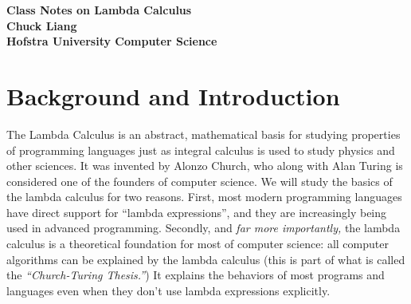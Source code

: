 \parindent=0.0cm
\parskip=0.4cm
\setlength{\textwidth}{15cm}
\setlength{\oddsidemargin}{+0.4cm}
\setlength{\evensidemargin}{0.4cm}
\setlength{\topmargin}{+0.0cm}
\setlength{\headheight}{0cm}
\setlength{\textheight}{22cm}
\setlength{\headsep}{1cm}
\renewcommand{\baselinestretch}{1.0}
\def\nvec#1,#2{#1_{1}, \ldots, #1_{#2}}

\pagestyle{plain}



\newcommand\rrr  {\rightarrow}
\newcommand\lrr  {\longrightarrow}
\newcommand\lrrs {\stackrel{\ast}{\longrightarrow}}
\newcommand\lrrb {\stackrel{\ast}{\longleftrightarrow}}



\begin{center}
{\large\bf Class Notes on Lambda Calculus}\\[5pt]
  {\normalsize\bf Chuck Liang}\\[5pt]
  {\normalsize\bf Hofstra University Computer Science}
\end{center}

\normalsize

\bigskip
\section{Background and Introduction}

The Lambda Calculus is an abstract, mathematical basis for studying properties
of programming languages just as integral calculus is used to study physics and
other sciences.  It was invented by Alonzo Church, who along with Alan Turing is
considered one of the founders of computer science.
We will study the basics of the lambda calculus for two
reasons.  First, most modern programming languages have direct support
for ``lambda expressions'', and they are increasingly being used in
advanced programming.  Secondly, and {\em far more importantly,\/} the
lambda calculus is a theoretical foundation for most of computer science:
all computer algorithms can be explained by the lambda
calculus (this is part of what is called the {\em ``Church-Turing
  Thesis.''\/}) It explains the behaviors of most programs and
languages even when they don't use lambda expressions explicitly.

